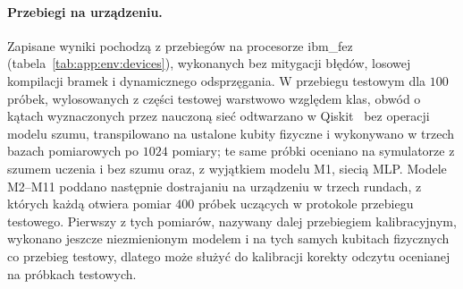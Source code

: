 \paragraph{Przebiegi na urządzeniu.}
Zapisane wyniki pochodzą z przebiegów na procesorze ibm\_fez (tabela~\ref{tab:app:env:devices}), wykonanych bez mitygacji błędów, losowej kompilacji bramek i dynamicznego odsprzęgania.
W przebiegu testowym dla $100$ próbek, wylosowanych z części testowej warstwowo względem klas, obwód o kątach wyznaczonych przez nauczoną sieć odtwarzano w Qiskit~\cite{javadi-abhari_quantum_2024} bez operacji modelu szumu, transpilowano na ustalone kubity fizyczne i wykonywano w trzech bazach pomiarowych po $1024$ pomiary; te same próbki oceniano na symulatorze z szumem uczenia i bez szumu oraz, z wyjątkiem modelu M1, siecią MLP.
Modele M2--M11 poddano następnie dostrajaniu na urządzeniu w trzech rundach, z których każdą otwiera pomiar $400$ próbek uczących w protokole przebiegu testowego.
Pierwszy z tych pomiarów, nazywany dalej przebiegiem kalibracyjnym, wykonano jeszcze niezmienionym modelem i na tych samych kubitach fizycznych co przebieg testowy, dlatego może służyć do kalibracji korekty odczytu ocenianej na próbkach testowych.

